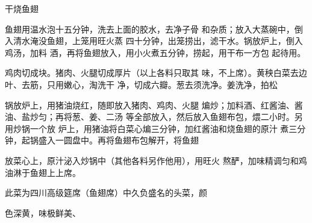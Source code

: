 \begin{recipe}{干烧鱼翅}

\ingredients


\cooking

\step 	鱼翅用温水泡十五分钟，洗去上面的胶水，去净子骨 和杂质；放入大蒸碗中，倒入清水淹没鱼翅，上笼用旺火蒸 四十分钟，出笼捞出，滤干水。锅放炉上，倒入鸡汤，加料 酒，再将鱼翅放入，用小火煮五分钟，捞起，用干布一方包 起待用。

\step 	鸡肉切成块。猪肉、火腿切成厚片（以上各料只取其 味，不上席）。黄秧白菜去边叶、去筋，只用嫩心，淘洗干 净，切成六瓣。葱去须洗净。姜洗净，拍松

\step 	锅放炉上，用猪油烧红，随即放入猪肉、鸡肉、火腿 煸炒；加料酒、红酱油、酱油、盐炒匀；再将葱、姜、二汤 等全部放入，然后放入鱼翅布包，煨二小时。另用炒锅一个放 炉上，用猪油将白菜心煸三分钟，加红酱油和烧鱼翅的原汁 煮三分钟，起锅盛入一圆盘中。再将鱼翅布包解开，将鱼翅

放菜心上，原汁泌入炒锅中（其他各料另作他用），用旺火 熬酽，加味精调匀和鸡油淋于鱼翅上上席。

\notes

此菜为四川高级筵席（鱼翅席）中久负盛名的头菜，颜

色深黄，味极鲜美、

\end{recipe}

